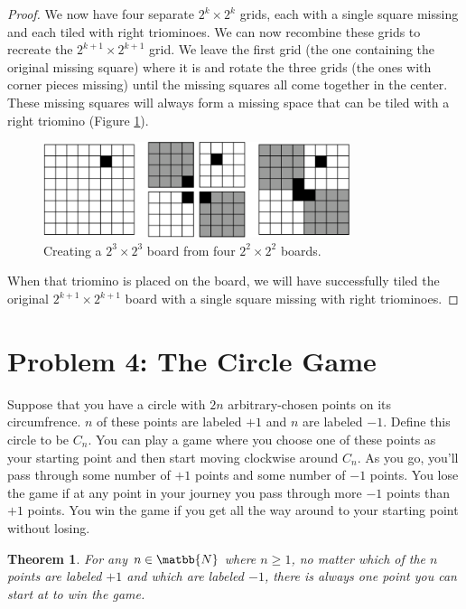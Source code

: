 \documentclass[10pt,letter]{article}
\newtheorem{nthm}{Theorem}
\begin{document}
\begin{proof}
We now have four separate $2^k \times 2^k$ grids, each with a single square missing and each tiled with right triominoes. We can now recombine these grids to recreate the $2^{k+1} \times 2^{k+1}$ grid. We leave the first grid (the one containing the original missing square) where it is and rotate the three grids (the ones with corner pieces missing) until the missing squares all come together in the center. These missing squares will always form a missing space that can be tiled with a right triomino (Figure \ref{fig:tile_proof}).

\begin{figure}[h]
    \centering
    \includegraphics[width=0.8\textwidth]{rightTriominoesProof.png}
    \caption{Creating a $2^3 \times 2^3$ board from four $2^2 \times 2^2$ boards.}
    \label{fig:tile_proof}
\end{figure}

When that triomino is placed on the board, we will have successfully tiled the original $2^{k+1} \times 2^{k+1}$ board with a single square missing with right triominoes.

\end{proof}

\section*{Problem 4: The Circle Game}
Suppose that you have a circle with $2n$ arbitrary-chosen points on its circumfrence. $n$ of these points are labeled $+1$ and $n$ are labeled $-1$. Define this circle to be $C_n$. You can play a game where you choose one of these points as your starting point and then start moving clockwise around $C_n$. As you go, you'll pass through some number of $+1$ points and some number of $-1$ points. You lose the game if at any point in your journey you pass through more $-1$ points than $+1$ points. You win the game if you get all the way around to your starting point without losing.
\begin{nthm} \label{thm:circlethm}
  For any $n \in \matbb{N}$ where $n \ge 1$, no matter which of the $n$ points are labeled $+1$ and which are labeled $-1$, there is always one point you can start at to win the game.
\end{nthm}
\end{document}
